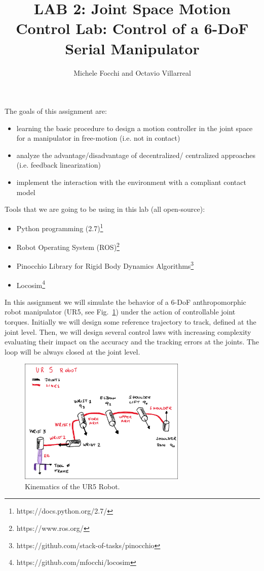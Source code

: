 \documentclass[11pt]{article}
\title{LAB 2: Joint Space Motion Control Lab: Control of a 6-DoF Serial Manipulator}
\author{Michele Focchi and Octavio Villarreal}
\date{}
\begin{document}
	\maketitle
	\noindent
	The goals of this assignment are:
	\begin{itemize}
		\item learning the basic procedure to design a motion controller in the joint space for a manipulator in free-motion (i.e. not in contact)
		\item analyze the advantage/disadvantage of decentralized/ centralized approaches (i.e. feedback linearization)
		\item implement the interaction with the environment with a compliant contact model	 
	\end{itemize}
	
	\noindent
	Tools that we are going to be using in this lab (all open-source):
	\begin{itemize}
		\item Python programming (2.7)\footnote{https://docs.python.org/2.7/}
		\item Robot Operating System (ROS)\footnote{https://www.ros.org/}
		\item Pinocchio Library for Rigid Body Dynamics Algorithms\footnote{https://github.com/stack-of-tasks/pinocchio}
		\item Locosim\footnote{https://github.com/mfocchi/locosim}
	\end{itemize}
	In this assignment we will simulate the behavior of a 6-DoF anthropomorphic robot manipulator (UR5, see  Fig.~\ref{fig:UR5}) under the action of controllable joint torques. Initially we will design some reference trajectory to track, defined at the joint level. Then, we will design several control laws with increasing complexity evaluating their impact on the accuracy and the tracking errors at the joints. The loop will be always closed at the joint level.  
 
 \begin{figure}[bht]
 	\centering
 	\includegraphics[width=8cm]{ur5_Robot.pdf}
 	\caption{Kinematics of the UR5 Robot.}
 	\label{fig:UR5}
 \end{figure}
\end{document}
